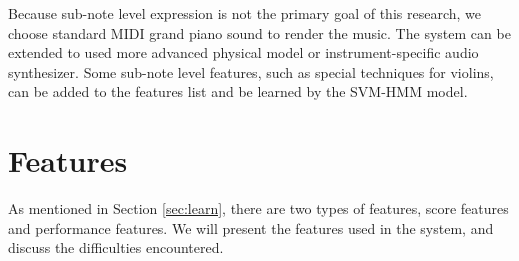 Because sub-note level expression is not the primary goal of this research, we choose standard MIDI grand piano sound to render the music. The system can be extended to used more advanced physical model or instrument-specific audio synthesizer. Some sub-note level features, such as special techniques for violins, can be added to the features list and be learned by the SVM-HMM model.
   
\section{Features}\label{sec:features}

   As mentioned in Section \ref{sec:learn}, there are two types of features, score features and performance features. We will present the features used in the system, and discuss the difficulties encountered.
